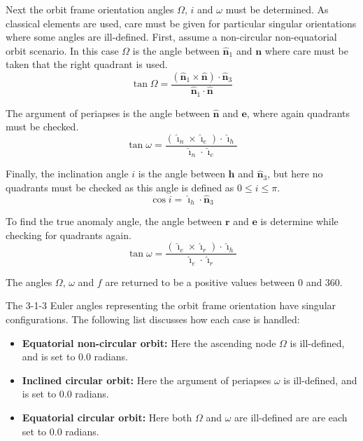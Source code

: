 Next the orbit frame orientation angles $\Omega$, $i$ and $\omega$ must be determined.  As classical elements are used, care must be given for particular singular orientations where some angles are ill-defined.  First, assume a non-circular non-equatorial orbit scenario.  In this case $\Omega$ is the angle between $\hat{\bm n}_{1}$ and $\bm n$ where care must be taken that the right quadrant is used.  
\begin{equation}
	\tan \Omega = \frac{(\hat{\bm n}_{1} \times \hat{\bm n}) \cdot \hat{\bm n}_{3}}
	{\hat{\bm n}_{1} \cdot \hat{\bm n}}
\end{equation}


The argument of periapses is the angle between $\hat{\bm n}$ and $\bm e$, where again quadrants must be checked.  
\begin{equation}
	\tan \omega = \frac{(\hat{\bm \imath}_{n} \times \hat{\bm \imath}_{e}) \cdot \hat{\bm \imath}_{h}}
	{\hat{\bm \imath}_{n} \cdot \hat{\bm \imath}_{e}}
\end{equation}

Finally, the inclination angle $i$ is the angle between $\bm h$ and $\hat{\bm n}_{3}$, but here no quadrants must be checked as this angle is defined as $0 \le i \le \pi$.  
\begin{equation}
	\cos i = \hat{\bm \imath}_{h} \cdot \hat{\bm n}_{3}
\end{equation}

To find the true anomaly angle, the angle between $\bm r$ and $\bm e$ is determine while checking for quadrants again.
\begin{equation}
	\tan \omega = \frac{(\hat{\bm \imath}_{e} \times \hat{\bm \imath}_{r}) \cdot \hat{\bm \imath}_{h}}
	{\hat{\bm \imath}_{e} \cdot \hat{\bm \imath}_{r}}
\end{equation}

The angles $\Omega$, $\omega$ and $f$ are returned to be a positive values between $0$ and 360\dg.

The 3-1-3 Euler angles representing the orbit frame orientation have singular configurations.  The following list discusses how each case is handled:
\begin{itemize}
	\item {\bfseries Equatorial non-circular orbit:} Here the ascending node $\Omega$ is ill-defined, and is  set to 0.0 radians.  
	\item {\bfseries Inclined circular orbit:}  Here the argument of periapses $\omega$ is ill-defined, and is set to 0.0 radians.
	\item {\bfseries Equatorial circular orbit:} Here both $\Omega$ and $\omega$ are ill-defined are are each set to 0.0 radians.
\end{itemize}
















